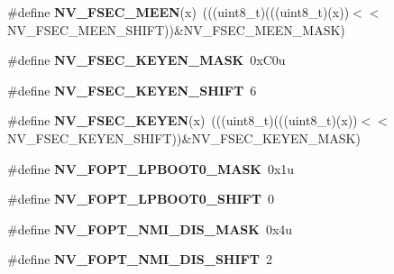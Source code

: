 \begin{DoxyCompactItemize}
\item 
\mbox{\label{group___n_v___register___masks_ga6a3e909b41d8dd2ca5f55b10e8cc4e52}} 
\#define {\bfseries N\+V\+\_\+\+F\+S\+E\+C\+\_\+\+M\+E\+EN}(x)~(((uint8\+\_\+t)(((uint8\+\_\+t)(x))$<$$<$N\+V\+\_\+\+F\+S\+E\+C\+\_\+\+M\+E\+E\+N\+\_\+\+S\+H\+I\+FT))\&N\+V\+\_\+\+F\+S\+E\+C\+\_\+\+M\+E\+E\+N\+\_\+\+M\+A\+SK)
\item 
\mbox{\label{group___n_v___register___masks_ga50a87e963eeaaf5fdb904e7bac9099af}} 
\#define {\bfseries N\+V\+\_\+\+F\+S\+E\+C\+\_\+\+K\+E\+Y\+E\+N\+\_\+\+M\+A\+SK}~0x\+C0u
\item 
\mbox{\label{group___n_v___register___masks_ga3df55e24a4dc42a19afc15b4a3137bae}} 
\#define {\bfseries N\+V\+\_\+\+F\+S\+E\+C\+\_\+\+K\+E\+Y\+E\+N\+\_\+\+S\+H\+I\+FT}~6
\item 
\mbox{\label{group___n_v___register___masks_gaca6379e60e0371d1d0c8493abe9db870}} 
\#define {\bfseries N\+V\+\_\+\+F\+S\+E\+C\+\_\+\+K\+E\+Y\+EN}(x)~(((uint8\+\_\+t)(((uint8\+\_\+t)(x))$<$$<$N\+V\+\_\+\+F\+S\+E\+C\+\_\+\+K\+E\+Y\+E\+N\+\_\+\+S\+H\+I\+FT))\&N\+V\+\_\+\+F\+S\+E\+C\+\_\+\+K\+E\+Y\+E\+N\+\_\+\+M\+A\+SK)
\item 
\mbox{\label{group___n_v___register___masks_ga47bf10ef60ce96fc8d7fdbd7378d9a52}} 
\#define {\bfseries N\+V\+\_\+\+F\+O\+P\+T\+\_\+\+L\+P\+B\+O\+O\+T0\+\_\+\+M\+A\+SK}~0x1u
\item 
\mbox{\label{group___n_v___register___masks_ga342e15fe4074c4a1bef9dcd73b312b56}} 
\#define {\bfseries N\+V\+\_\+\+F\+O\+P\+T\+\_\+\+L\+P\+B\+O\+O\+T0\+\_\+\+S\+H\+I\+FT}~0
\item 
\mbox{\label{group___n_v___register___masks_gaa2bcf41c89cbfe86ef8eaf6fff2ad068}} 
\#define {\bfseries N\+V\+\_\+\+F\+O\+P\+T\+\_\+\+N\+M\+I\+\_\+\+D\+I\+S\+\_\+\+M\+A\+SK}~0x4u
\item 
\mbox{\label{group___n_v___register___masks_ga8a4632e08257c81a80d8be3cdac911f9}} 
\#define {\bfseries N\+V\+\_\+\+F\+O\+P\+T\+\_\+\+N\+M\+I\+\_\+\+D\+I\+S\+\_\+\+S\+H\+I\+FT}~2

\end{DoxyCompactItemize}
